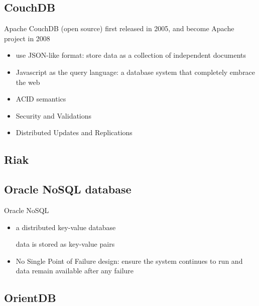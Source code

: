 \subsection{CouchDB}
\label{sec:CouchDB}

Apache CouchDB (open source) first released in 2005, and become Apache project
in 2008
\begin{itemize}
  \item use JSON-like format: store data as a collection of independent
  documents
  
  \item Javascript as the query language: a database system that completely
  embrace the web
  
  \item ACID semantics
  
  \item Security and Validations
  
  \item Distributed Updates and Replications
\end{itemize}


\subsection{Riak}
\label{sec:Riak}



\subsection{Oracle NoSQL database}

Oracle NoSQL 
\begin{itemize}
  \item a distributed key-value database
  
 data is stored as key-value pairs
 
 \item No Single Point of Failure design: ensure the system continues to run and
 data remain available after any failure
\end{itemize}

\subsection{OrientDB}


